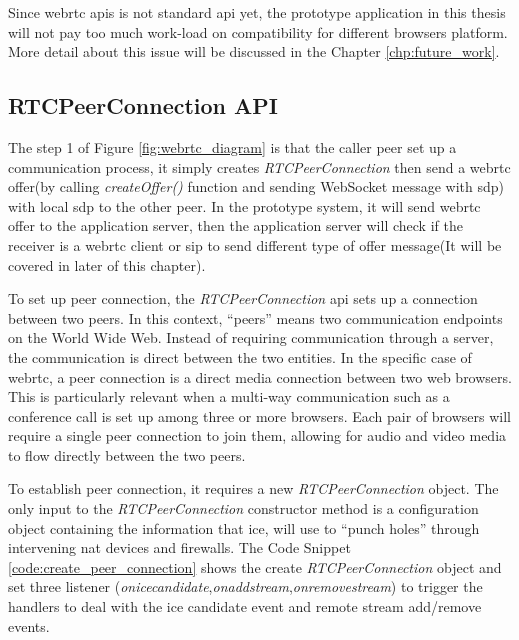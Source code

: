 \par Since \gls{webrtc} \gls{api}s is not standard \gls{api} yet, the prototype application in this thesis will not pay too much work-load on compatibility for different browsers platform. More detail about this issue will be discussed in the Chapter \ref{chp:future_work}.

\subsection{RTCPeerConnection API}

\noindent The step 1 of Figure \ref{fig:webrtc_diagram} is that the caller peer set up a communication process, it simply creates \textit{RTCPeerConnection} then send a \gls{webrtc} offer(by calling \textit{createOffer()} function and sending WebSocket message with \gls{sdp}) with local \gls{sdp} to the other peer. In the prototype system, it will send \gls{webrtc} offer to the application server, then the application server will check if the receiver is a \gls{webrtc} client or \gls{sip} to send different type of offer message(It will be covered in later of this chapter).

\par To set up peer connection, the \textit{RTCPeerConnection} \gls{api} sets up a connection between two peers. In this context, “peers” means two communication endpoints on the World Wide Web. Instead of requiring communication through a server, the communication is direct between the two entities. In the specific case of \gls{webrtc}, a peer connection is a direct media connection between two web browsers. This is particularly relevant when a multi-way communication such as a conference call is set up among three or more browsers. Each pair of browsers will require a single peer connection to join them, allowing for audio and video media to flow directly between the two peers. 

\par To establish peer connection, it requires a new \textit{RTCPeerConnection} object. The only input to the \textit{RTCPeerConnection} constructor method is a configuration object containing the information that \gls{ice}, will use to “punch holes” through intervening \gls{nat} devices and firewalls. The Code Snippet \ref{code:create_peer_connection} shows the create \textit{RTCPeerConnection} object and set three listener (\textit{onicecandidate},\textit{onaddstream},\textit{onremovestream}) to trigger the handlers to deal with the \gls{ice} candidate event and remote stream add/remove events.

